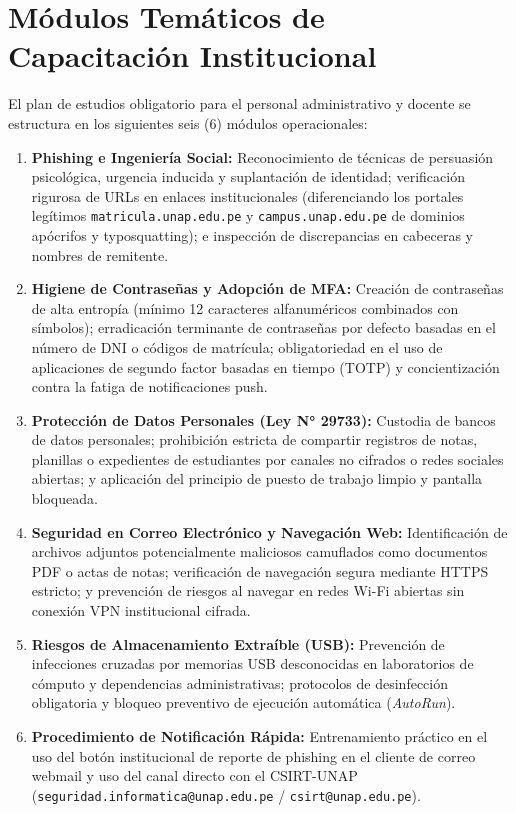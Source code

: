 \section{Módulos Temáticos de Capacitación Institucional}

El plan de estudios obligatorio para el personal administrativo y docente se estructura en los siguientes seis (6) módulos operacionales:

\begin{enumerate}[leftmargin=1.4em, itemsep=1.5pt, parsep=0.5pt, topsep=2pt]
    \item \textbf{Phishing e Ingeniería Social:} Reconocimiento de técnicas de persuasión psicológica, urgencia inducida y suplantación de identidad; verificación rigurosa de URLs en enlaces institucionales (diferenciando los portales legítimos \texttt{matri\allowbreak cula.\allowbreak unap.\allowbreak edu.pe} y \texttt{campus.\allowbreak unap.\allowbreak edu.pe} de dominios apócrifos y typosquatting); e inspección de discrepancias en cabeceras y nombres de remitente.
    
    \item \textbf{Higiene de Contraseñas y Adopción de MFA:} Creación de contraseñas de alta entropía (mínimo 12 caracteres alfanuméricos combinados con símbolos); erradicación terminante de contraseñas por defecto basadas en el número de DNI o códigos de matrícula; obligatoriedad en el uso de aplicaciones de segundo factor basadas en tiempo (TOTP) y concientización contra la fatiga de notificaciones push.
    
    \item \textbf{Protección de Datos Personales (Ley N° 29733):} Custodia de bancos de datos personales; prohibición estricta de compartir registros de notas, planillas o expedientes de estudiantes por canales no cifrados o redes sociales abiertas; y aplicación del principio de puesto de trabajo limpio y pantalla bloqueada.
    
    \item \textbf{Seguridad en Correo Electrónico y Navegación Web:} Identificación de archivos adjuntos potencialmente maliciosos camuflados como documentos PDF o actas de notas; verificación de navegación segura mediante HTTPS estricto; y prevención de riesgos al navegar en redes Wi-Fi abiertas sin conexión VPN institucional cifrada.
    
    \item \textbf{Riesgos de Almacenamiento Extraíble (USB):} Prevención de infecciones cruzadas por memorias USB desconocidas en laboratorios de cómputo y dependencias administrativas; protocolos de desinfección obligatoria y bloqueo preventivo de ejecución automática (\textit{AutoRun}).
    
    \item \textbf{Procedimiento de Notificación Rápida:} Entrenamiento práctico en el uso del botón institucional de reporte de phishing en el cliente de correo webmail y uso del canal directo con el CSIRT-UNAP (\texttt{seguridad.\allowbreak informatica@\allowbreak unap.\allowbreak edu.pe} / \texttt{csirt@\allowbreak unap.\allowbreak edu.pe}).
\end{enumerate}

